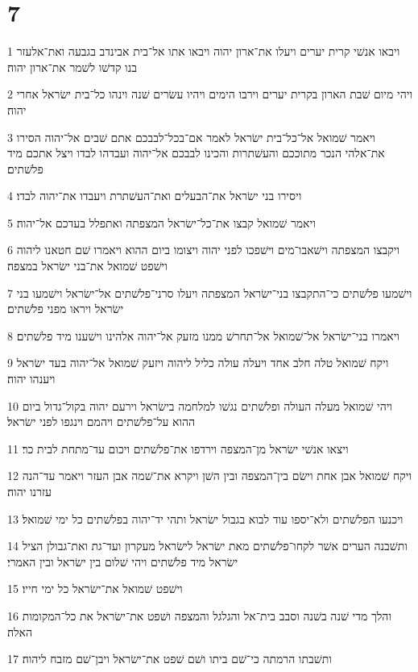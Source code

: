 \chapter{7}

\par 1 ויבאו אנשׁי קרית יערים ויעלו את־ארון יהוה ויבאו אתו אל־בית אבינדב בגבעה ואת־אלעזר בנו קדשׁו לשׁמר את־ארון יהוה׃
\par 2 ויהי מיום שׁבת הארון בקרית יערים וירבו הימים ויהיו עשׂרים שׁנה וינהו כל־בית ישׂראל אחרי יהוה׃
\par 3 ויאמר שׁמואל אל־כל־בית ישׂראל לאמר אם־בכל־לבבכם אתם שׁבים אל־יהוה הסירו את־אלהי הנכר מתוככם והעשׁתרות והכינו לבבכם אל־יהוה ועבדהו לבדו ויצל אתכם מיד פלשׁתים׃
\par 4 ויסירו בני ישׂראל את־הבעלים ואת־העשׁתרת ויעבדו את־יהוה לבדו׃
\par 5 ויאמר שׁמואל קבצו את־כל־ישׂראל המצפתה ואתפלל בעדכם אל־יהוה׃
\par 6 ויקבצו המצפתה וישׁאבו־מים וישׁפכו לפני יהוה ויצומו ביום ההוא ויאמרו שׁם חטאנו ליהוה וישׁפט שׁמואל את־בני ישׂראל במצפה׃
\par 7 וישׁמעו פלשׁתים כי־התקבצו בני־ישׂראל המצפתה ויעלו סרני־פלשׁתים אל־ישׂראל וישׁמעו בני ישׂראל ויראו מפני פלשׁתים׃
\par 8 ויאמרו בני־ישׂראל אל־שׁמואל אל־תחרשׁ ממנו מזעק אל־יהוה אלהינו וישׁענו מיד פלשׁתים׃
\par 9 ויקח שׁמואל טלה חלב אחד ויעלה עולה כליל ליהוה ויזעק שׁמואל אל־יהוה בעד ישׂראל ויענהו יהוה׃
\par 10 ויהי שׁמואל מעלה העולה ופלשׁתים נגשׁו למלחמה בישׂראל וירעם יהוה בקול־גדול ביום ההוא על־פלשׁתים ויהמם וינגפו לפני ישׂראל׃
\par 11 ויצאו אנשׁי ישׂראל מן־המצפה וירדפו את־פלשׁתים ויכום עד־מתחת לבית כר׃
\par 12 ויקח שׁמואל אבן אחת וישׂם בין־המצפה ובין השׁן ויקרא את־שׁמה אבן העזר ויאמר עד־הנה עזרנו יהוה׃
\par 13 ויכנעו הפלשׁתים ולא־יספו עוד לבוא בגבול ישׂראל ותהי יד־יהוה בפלשׁתים כל ימי שׁמואל׃
\par 14 ותשׁבנה הערים אשׁר לקחו־פלשׁתים מאת ישׂראל לישׂראל מעקרון ועד־גת ואת־גבולן הציל ישׂראל מיד פלשׁתים ויהי שׁלום בין ישׂראל ובין האמרי׃
\par 15 וישׁפט שׁמואל את־ישׂראל כל ימי חייו׃
\par 16 והלך מדי שׁנה בשׁנה וסבב בית־אל והגלגל והמצפה ושׁפט את־ישׂראל את כל־המקומות האלה׃
\par 17 ותשׁבתו הרמתה כי־שׁם ביתו ושׁם שׁפט את־ישׂראל ויבן־שׁם מזבח ליהוה׃

